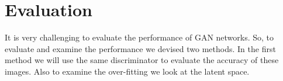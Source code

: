 \begin{table}[H]
\begin{tabular}{|llllll|}
\end{tabular}
\end{table}




\section{Evaluation}

It is very challenging to evaluate the performance of GAN networks. So, to evaluate and examine the performance we devised two methods. In the first method we will use the same discriminator to evaluate the accuracy of these images. Also to examine the over-fitting we look at the latent space. 